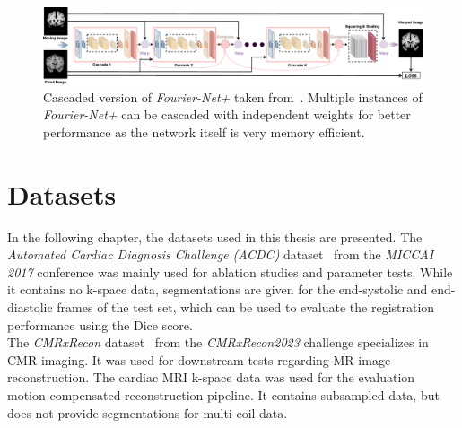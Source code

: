 \begin{figure}[h] %
	\centering
	\graphicspath{{images/}{\main/images/}}
	\includegraphics[width=\linewidth]{ArchitectureFourier-Net+Cascaded.png} 
	\caption{Cascaded version of \emph{Fourier-Net+} taken from~\cite{Fourier-Net+}. Multiple instances of \emph{Fourier-Net+} can be cascaded with independent weights for better performance as the network itself is very memory efficient.}
	\label{fig:Fourier-Net+Cascaded}
\end{figure}


\section{Datasets}	\label{Sec:Datasets}
In the following chapter, the datasets used in this thesis are presented. The \emph{Automated Cardiac Diagnosis Challenge (ACDC)} dataset~\cite{ACDC} from the \emph{MICCAI 2017} conference was mainly used for ablation studies and parameter tests. While it contains no k-space data, segmentations are given for the end-systolic and end-diastolic frames of the test set, which can be used to evaluate the registration performance using the Dice score. \\
The \emph{CMRxRecon} dataset~\cite{CMRxRecon} from the \emph{CMRxRecon2023} challenge specializes in CMR imaging. It was used for downstream-tests regarding MR image reconstruction. The cardiac MRI k-space data was used for the evaluation motion-compensated reconstruction pipeline. It contains subsampled data, but does not provide segmentations for multi-coil data.

